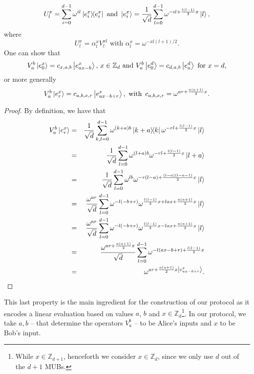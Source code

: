 \begin{equation*}
    U^x_l = \sum^{d-1}_{i=0} \omega^{i l} \ketbra{e^x_i}{e^x_i} \text{ and }\ket{e^x_i} = \frac{1}{\sqrt{d}} \sum^{d-1}_{l=0} \omega^{- i l + \frac{l(l-1)}{2}x}\ket{l},
\end{equation*}
where
\begin{equation*}
    U^x_l = \alpha^x_l V^{x l}_l \text{ with }\alpha^x_l = \omega^{-x l(l+1)/2}.
\end{equation*}
One can show that
\begin{equation*}
  V^b_a \ket{e^x_0} = c_{x,a,b} \ket{e^x_{ax - b}},\, x\in\mathbb{Z}_d  \text{ and }
V^b_a \ket{e^d_0} = c_{d,a,b} \ket{e^d_a} {\text{ for } x=d},\end{equation*}
or more generally
\begin{equation}
    V^b_a \ket{e^x_r} = c_{a, b, x, r} \ket{e^x_{ax - b + r}}, \text{ with }\, c_{a, b, x, r} = \omega^{ar + \frac{a(a+1)}{2}x}. \label{eq:main_relation}
\end{equation}
\begin{proof}
By definition, we have that
\begin{eqnarray*}
V^b_a \ket{e^x_r} &=& \frac{1}{\sqrt{d}} \sum_{k,l = 0}^{d-1} \omega^{(k+a)b}\ketbra{k+a}{k} \omega^{-rl + \frac{l(l-1)}{2}x} \ket{l}\\
&=&  \frac{1}{\sqrt{d}} \sum_{l = 0}^{d-1} \omega^{(l+a)b} \omega^{-rl + \frac{l(l-1)}{2}x} \ket{l+a}\\
&=&  \frac{1}{\sqrt{d}} \sum_{l = 0}^{d-1} \omega^{lb}\omega^{-r(l-a) + \frac{(l-a)(l-a-1)}{2}x} \ket{l} \\
&=&  \frac{\omega^{ar}}{\sqrt{d}} \sum_{l = 0}^{d-1} \omega^{-l(-b+r)}\omega^{ \frac{l(l-1)}{2}x + lax + \frac{a(a+1)}{2}x } \ket{l} \\
&=&  \frac{\omega^{ar}}{\sqrt{d}} \sum_{l = 0}^{d-1} \omega^{-l(-b+r)}\omega^{ \frac{l(l-1)}{2}x - lax + \frac{a(a+1)}{2}x } \ket{l} \\
&=&  \frac{\omega^{ar + \frac{a(a+1)}{2}x}}{\sqrt{d}} \sum_{l = 0}^{d-1} \omega^{-l(ax-b+r) + \frac{l(l-1)}{2}x}\\
&=& \omega^{ar + \frac{a(a+1)}{2}x \ket{e^x_{ax - b + r}}}.
\end{eqnarray*}
\end{proof}
This last property is the main ingredient for the construction of our protocol as it encodes a linear evaluation based on values $a$, $b$ and $x \in \mathbb{Z}_d$\footnote{While $x \in \mathbb{Z}_{d+1}$, henceforth we consider $x \in \mathbb{Z}_{d}$, since we only use $d $ out of the $d+1$ MUBs.}. In our protocol, we take $a,b$ -- that determine the operators $V^b_ a$ -- to be Alice's inputs and $x$ to be Bob's input.

